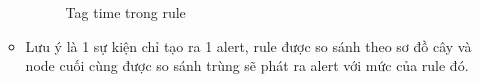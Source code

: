 \begin{itemize}
\begin{itemize}
      \begin{figure}[h!]
	\centering 
{}
	\caption{Tag time trong rule}
  \end{figure}
      \item Lưu ý là 1 sự kiện chỉ tạo ra 1 alert, rule được so sánh theo sơ đồ
      cây và node cuối cùng được so sánh trùng sẽ phát ra alert với mức của rule đó.
    \end{itemize}
  \end{itemize}
